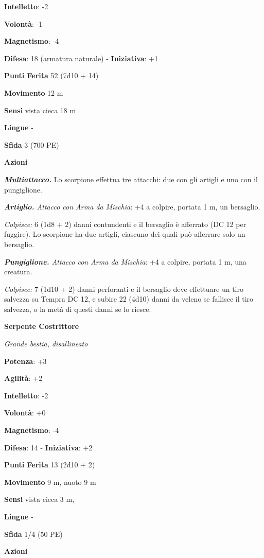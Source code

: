 \begin{multicols}{2}
\textbf{Intelletto}: -2

\textbf{Volontà}: -1

\textbf{Magnetismo}: -4

\textbf{Difesa}: 18 (armatura naturale) - \textbf{Iniziativa}: +1

\textbf{Punti Ferita} 52 (7d10 + 14)

\textbf{Movimento} 12 m

\textbf{Sensi} vista cieca 18 m

\textbf{Lingue} -

\textbf{Sfida} 3 (700 PE)\smallskip

\smallskip\textbf{Azioni}

\emph{\textbf{Multiattacco.}} Lo scorpione effettua tre attacchi: due
con gli artigli e uno con il pungiglione.

\emph{\textbf{Artiglio.} Attacco con Arma da Mischia}: +4 a colpire,
portata 1 m, un bersaglio.

\emph{Colpisce:} 6 (1d8 + 2) danni contundenti e il bersaglio è
afferrato (DC 12 per fuggire). Lo scorpione ha due artigli, ciascuno dei
quali può afferrare solo un bersaglio.

\emph{\textbf{Pungiglione.} Attacco con Arma da Mischia}: +4 a colpire,
portata 1 m, una creatura.

\emph{Colpisce:} 7 (1d10 + 2) danni perforanti e il bersaglio deve
effettuare un tiro salvezza su Tempra DC 12, e subire 22 (4d10)
danni da veleno se fallisce il tiro salvezza, o la metà di questi danni
se lo riesce.

\textbf{Serpente Costrittore}

\emph{Grande bestia, disallineato}

\textbf{Potenza}: +3

\textbf{Agilità}: +2

\textbf{Intelletto}: -2

\textbf{Volontà}: +0

\textbf{Magnetismo}: -4

\textbf{Difesa}: 14 - \textbf{Iniziativa}: +2

\textbf{Punti Ferita} 13 (2d10 + 2)

\textbf{Movimento} 9 m, nuoto 9 m

\textbf{Sensi} vista cieca 3 m, 

\textbf{Lingue} -

\textbf{Sfida} 1/4 (50 PE)\smallskip

\smallskip\textbf{Azioni}


\end{multicols}
